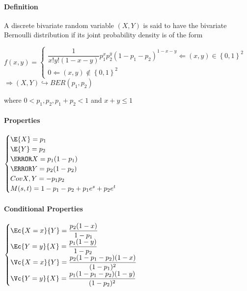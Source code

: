 \paragraph{Definition}
A discrete bivariate random variable $(X, Y )$ is said to have
the bivariate Bernoulli distribution if its joint probability density is of the
form
\begin{center}
	$f(x,y)=
	\begin{cases}	
		\dfrac{1}{x!y!(1-x-y)}p_{1}^{x}p_{2}^{y}(1-p_{1}-p_{2})^{1-x-y}\Leftarrow (x,y)\in\left\{ 0,1 \right\}^{2}\\
		0\Leftarrow (x,y)\not\in\left\{ 0,1 \right\}^{2} 
	\end{cases}$	
	$\Rightarrow \left( X,Y \right)\hookrightarrow BER(p_{1},p_{2})
	$
\end{center}
where $0<p_{1},p_{2}, p_{1}+p_{2}<1$ and $x+y\leq 1$
\paragraph{Properties}
\begin{center}
	$
	\begin{cases}
	\E{X}=p_{1}\\
	\E{Y}=p_{2}\\
	\V{X}=p_{1}(1-p_{1})\\
	\V{Y}=p_{2}(1-p_{2})\\
	Cov{X,Y}=-p_{1}p_{2}\\
	M(s,t)=1-p_{1}-p_{2}+p_{1}e^{s}+p_{2}e^{t}
	\end{cases}
	$
\end{center}
\paragraph{Conditional Properties}
\begin{center}
	$
	\begin{cases}
	\Ec{X=x}{Y}=\dfrac{p_{2}(1-x)}{1-p_{1}}\\
	\Ec{Y=y}{X}=\dfrac{p_{1}(1-y)}{1-p_{2}}\\
	\Vc{X=x}{Y}=\dfrac{p_{2}(1-p_{1}-p_{2})(1-x)}{(1-p_{1})^{2}}\\
	\Vc{Y=y}{X}=\dfrac{p_{1}(1-p_{1}-p_{2})(1-y)}{(1-p_{2})^{2}}
	\end{cases}
	$
\end{center}
